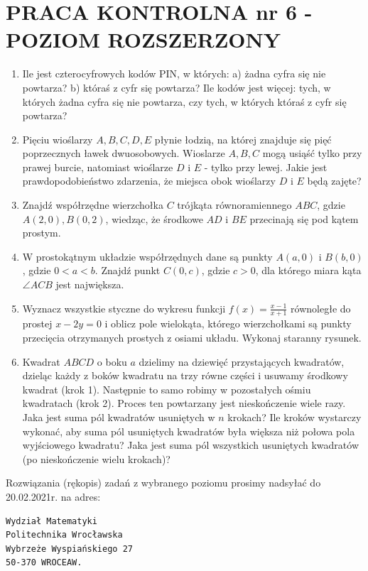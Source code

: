 \documentclass[10pt]{article}
\begin{document}
\section*{PRACA KONTROLNA nr 6 - POZIOM ROZSZERZONY}
\begin{enumerate}
  \item Ile jest czterocyfrowych kodów PIN, w których: a) żadna cyfra się nie powtarza? b) któraś z cyfr się powtarza? Ile kodów jest więcej: tych, w których żadna cyfra się nie powtarza, czy tych, w których któraś z cyfr się powtarza?
  \item Pięciu wioślarzy $A, B, C, D, E$ płynie łodzią, na której znajduje się pięć poprzecznych ławek dwuosobowych. Wioslarze $A, B, C$ mogą usiąść tylko przy prawej burcie, natomiast wioślarze $D$ i $E$ - tylko przy lewej. Jakie jest prawdopodobieństwo zdarzenia, że miejsca obok wioślarzy $D$ i $E$ będą zajęte?
  \item Znajdź współrzędne wierzchołka $C$ trójkąta równoramiennego $A B C$, gdzie $A(2,0), B(0,2)$, wiedząc, że środkowe $A D$ i $B E$ przecinają się pod kątem prostym.
  \item W prostokątnym układzie współrzędnych dane są punkty $A(a, 0)$ i $B(b, 0)$, gdzie $0<a<b$. Znajdź punkt $C(0, c)$, gdzie $c>0$, dla którego miara kąta $\angle A C B$ jest największa.
  \item Wyznacz wszystkie styczne do wykresu funkcji $f(x)=\frac{x-1}{x+1}$ równoległe do prostej $x-2 y=0$ i oblicz pole wielokąta, którego wierzchołkami są punkty przecięcia otrzymanych prostych z osiami układu. Wykonaj staranny rysunek.
  \item Kwadrat $A B C D$ o boku $a$ dzielimy na dziewięć przystających kwadratów, dzieląc każdy z boków kwadratu na trzy równe części i usuwamy środkowy kwadrat (krok 1). Następnie to samo robimy w pozostałych ośmiu kwadratach (krok 2). Proces ten powtarzany jest nieskończenie wiele razy. Jaka jest suma pól kwadratów usuniętych w $n$ krokach? Ile kroków wystarczy wykonać, aby suma pól usuniętych kwadratów była większa niż połowa pola wyjściowego kwadratu? Jaka jest suma pól wszystkich usuniętych kwadratów (po nieskończenie wielu krokach)?
\end{enumerate}

Rozwiązania (rękopis) zadań z wybranego poziomu prosimy nadsyłać do 20.02.2021r. na adres:

\begin{verbatim}
Wydział Matematyki
Politechnika Wrocławska
Wybrzeże Wyspiańskiego 27
50-370 WROCEAW.
\end{verbatim}
\end{document}
